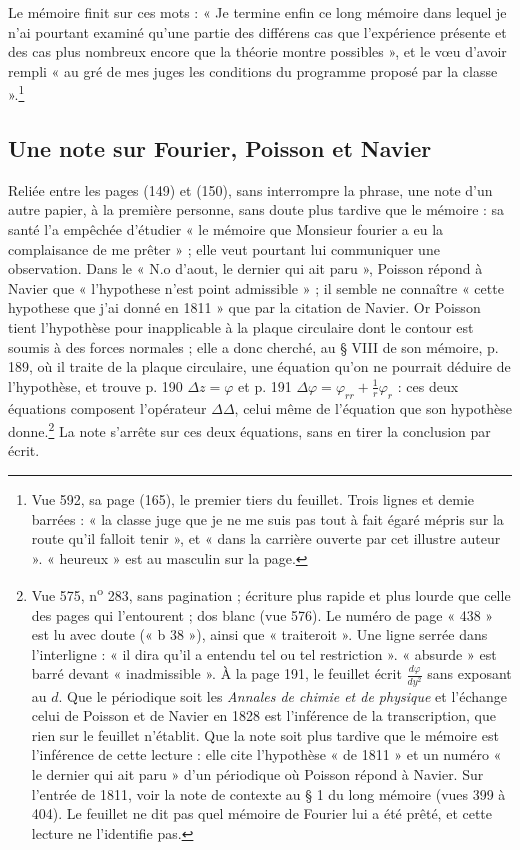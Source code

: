 \documentclass[11pt,a4paper]{article}
\begin{document}
Le mémoire finit sur ces mots : « Je termine enfin ce long mémoire dans lequel je
n'ai pourtant examiné qu'une partie des différens cas que l'expérience présente
et des cas plus nombreux encore que la théorie montre possibles », et le vœu
d'avoir rempli « au gré de mes juges les conditions du programme proposé par la
classe ».\footnote{Vue 592, sa page (165), le premier tiers du feuillet. Trois
lignes et demie barrées : « la classe juge que je ne me suis pas tout à fait
égaré mépris sur la route qu'il falloit tenir », et « dans la carrière ouverte
par cet illustre auteur ». « heureux » est au masculin sur la page.}

\subsection*{Une note sur Fourier, Poisson et Navier}

Reliée entre les pages (149) et (150), sans interrompre la phrase, une note d'un
autre papier, à la première personne, sans doute plus tardive que le
mémoire : sa santé l'a
empêchée d'étudier « le mémoire que Monsieur fourier a eu la complaisance de me
prêter » ; elle veut pourtant lui communiquer une observation. Dans le
« N.o d'aout, le dernier qui ait paru », Poisson répond à Navier que
« l'hypothese n'est point admissible » ; il semble ne connaître « cette
hypothese que j'ai donné en 1811 » que par la citation de Navier. Or Poisson
tient l'hypothèse pour inapplicable à la plaque circulaire dont le contour est
soumis à des forces normales ; elle a donc cherché, au § VIII de son mémoire,
p. 189, où il traite de la plaque circulaire, une équation qu'on ne pourrait
déduire de l'hypothèse, et trouve p. 190 $\Delta z = \varphi$ et p. 191
$\Delta\varphi = \varphi_{rr} + \frac1r\varphi_r$ : ces deux équations
composent l'opérateur $\Delta\Delta$, celui même de l'équation que son
hypothèse donne.\footnote{Vue 575, n\textsuperscript{o} 283, sans pagination ; écriture
plus rapide et plus lourde que celle des pages qui l'entourent ; dos blanc (vue
576). Le numéro de page « 438 » est lu avec doute (« b 38 »), ainsi que
« traiteroit ». Une ligne serrée dans l'interligne : « il dira qu'il a entendu tel
ou tel restriction ». « absurde » est barré devant « inadmissible ». À la page
191, le feuillet écrit $\frac{d\varphi}{dy^2}$ sans exposant au $d$. Que le
périodique soit les \emph{Annales de chimie et de physique} et l'échange celui de
Poisson et de Navier en 1828 est l'inférence de la transcription, que rien sur
le feuillet n'établit. Que la note soit plus tardive que le mémoire est
l'inférence de cette lecture : elle cite l'hypothèse « de 1811 » et un numéro
« le dernier qui ait paru » d'un périodique où Poisson répond à Navier.
Sur l'entrée de 1811, voir la note de contexte au § 1 du long mémoire (vues
399 à 404). Le feuillet ne dit pas quel mémoire de Fourier lui a été prêté, et
cette lecture ne l'identifie pas.} La note s'arrête sur ces deux
équations, sans en tirer la conclusion par écrit.
\end{document}
